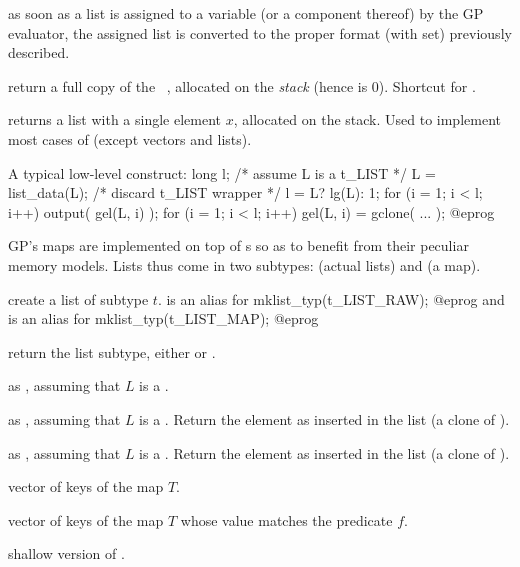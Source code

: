 \item as soon as a list is assigned to a variable (or a component thereof)
by the GP evaluator, the assigned list is converted to the proper format
(with  set) previously described.

 return a full copy of the ~,
allocated on the \emph{stack} (hence  is $0$). Shortcut for
.

 returns a list with a single element $x$,
allocated on the stack. Used to implement most cases of 
(except vectors and lists).

A typical low-level construct:
\bprog
  long l;
  /* assume L is a t_LIST */
  L = list_data(L); /* discard t_LIST wrapper */
  l = L? lg(L): 1;
  for (i = 1; i < l; i++) output( gel(L, i) );
  for (i = 1; i < l; i++) gel(L, i) = gclone( ... );
@eprog


GP's maps are implemented on top of s so as to benefit from
their peculiar memory models. Lists thus come in two subtypes: 
(actual lists) and  (a map).

 create a list of subtype $t$.
 is an alias for
\bprog
  mklist_typ(t_LIST_RAW);
@eprog
and
 is an alias for
\bprog
  mklist_typ(t_LIST_MAP);
@eprog

 return the list subtype, either  or
.

 as ,
assuming that $L$ is a .

 as ,
assuming that $L$ is a . Return the element as inserted
in the list (a clone of ).

 as ,
assuming that $L$ is a . Return the element as inserted
in the list (a clone of ).

 vector of keys of the map $T$.

vector of keys of the map $T$ whose value matches the predicate $f$.

 shallow version of .

